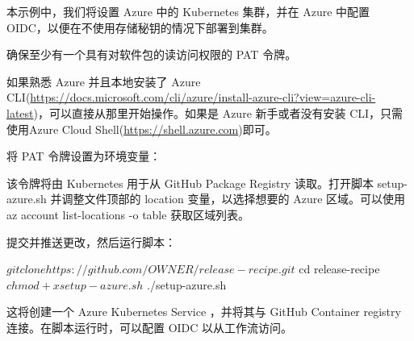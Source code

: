 
本示例中，我们将设置 Azure 中的 Kubernetes 集群，并在 Azure 中配置 OIDC，以便在不使用存储秘钥的情况下部署到集群。


确保至少有一个具有对软件包的读访问权限的 PAT 令牌。

如果熟悉 Azure 并且本地安装了 Azure CLI(\url{https://docs.microsoft.com/cli/azure/install-azure-cli?view=azure-cli-latest})，可以直接从那里开始操作。如果是 Azure 新手或者没有安装 CLI，只需使用Azure Cloud Shell(\url{https://shell.azure.com})即可。

将 PAT 令牌设置为环境变量：


该令牌将由 Kubernetes 用于从 GitHub Package Registry 读取。打开脚本 setup-azure.sh 并调整文件顶部的 location 变量，以选择想要的 Azure 区域。可以使用 az account list-locations -o table 获取区域列表。

提交并推送更改，然后运行脚本：

\begin{shell}
$ git clone https://github.com/{OWNER}/release-recipe.git
$ cd release-recipe
$ chmod +x setup-azure.sh
$ ./setup-azure.sh
\end{shell}

这将创建一个 Azure Kubernetes Service ，并将其与 GitHub Container registry 连接。在脚本运行时，可以配置 OIDC 以从工作流访问。


